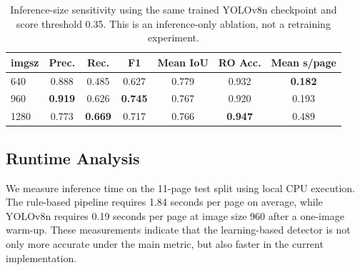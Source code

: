 \documentclass[12pt]{article}
\begin{document}
\begin{table}[t]
\centering
\caption{Inference-size sensitivity using the same trained YOLOv8n checkpoint and score threshold 0.35. This is an inference-only ablation, not a retraining experiment.}
\label{tab:imgsz_ablation}
\begin{tabular}{lcccccc}
\toprule
imgsz & Prec. & Rec. & F1 & Mean IoU & RO Acc. & Mean s/page \\
\midrule
640 & 0.888 & 0.485 & 0.627 & 0.779 & 0.932 & \textbf{0.182} \\
960 & \textbf{0.919} & 0.626 & \textbf{0.745} & 0.767 & 0.920 & 0.193 \\
1280 & 0.773 & \textbf{0.669} & 0.717 & 0.766 & \textbf{0.947} & 0.489 \\
\bottomrule
\end{tabular}
\end{table}

\subsection{Runtime Analysis}
We measure inference time on the 11-page test split using local CPU execution. The rule-based pipeline requires 1.84 seconds per page on average, while YOLOv8n requires 0.19 seconds per page at image size 960 after a one-image warm-up. These measurements indicate that the learning-based detector is not only more accurate under the main metric, but also faster in the current implementation.

\begin{table}[t]
\centering
\caption{Runtime on the 11-page test split under local CPU execution.}
\label{tab:runtime}
\end{table}
\end{document}
